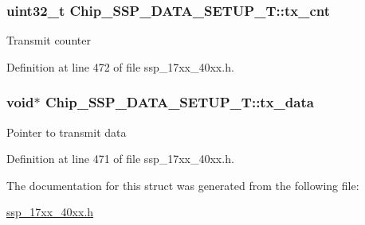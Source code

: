 \subsubsection[{\texorpdfstring{tx\+\_\+cnt}{tx_cnt}}]{\setlength{\rightskip}{0pt plus 5cm}uint32\+\_\+t Chip\+\_\+\+S\+S\+P\+\_\+\+D\+A\+T\+A\+\_\+\+S\+E\+T\+U\+P\+\_\+\+T\+::tx\+\_\+cnt}\hypertarget{structChip__SSP__DATA__SETUP__T_ab37848675426612b2fd0e986dbd2d260}{}\label{structChip__SSP__DATA__SETUP__T_ab37848675426612b2fd0e986dbd2d260}
Transmit counter 

Definition at line 472 of file ssp\+\_\+17xx\+\_\+40xx.\+h.

\subsubsection[{\texorpdfstring{tx\+\_\+data}{tx_data}}]{\setlength{\rightskip}{0pt plus 5cm}void$\ast$ Chip\+\_\+\+S\+S\+P\+\_\+\+D\+A\+T\+A\+\_\+\+S\+E\+T\+U\+P\+\_\+\+T\+::tx\+\_\+data}\hypertarget{structChip__SSP__DATA__SETUP__T_a490e82f2648097f22faa108b59d89848}{}\label{structChip__SSP__DATA__SETUP__T_a490e82f2648097f22faa108b59d89848}
Pointer to transmit data 

Definition at line 471 of file ssp\+\_\+17xx\+\_\+40xx.\+h.



The documentation for this struct was generated from the following file\+:\begin{DoxyCompactItemize}
\item 
\hyperlink{ssp__17xx__40xx_8h}{ssp\+\_\+17xx\+\_\+40xx.\+h}\end{DoxyCompactItemize}

